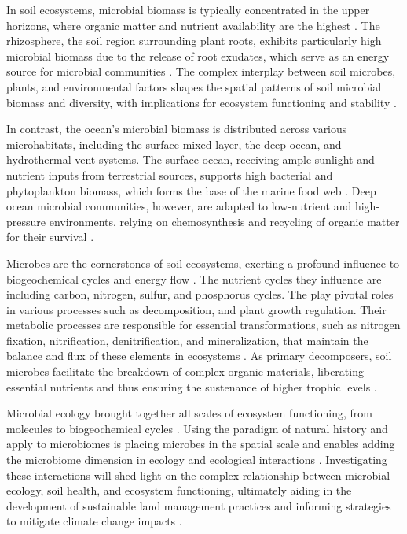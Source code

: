 In soil ecosystems, microbial biomass is typically concentrated in the upper
horizons, where organic matter and nutrient availability are the highest \parencite{Anthony2023}.
The rhizosphere, the soil region surrounding plant roots, exhibits particularly
high microbial biomass due to the release of root exudates, which serve as an
energy source for microbial communities \parencite{beugnon2022Abiotic}. The complex
interplay between soil microbes, plants, and environmental factors shapes the
spatial patterns of soil microbial biomass and diversity, with implications for
ecosystem functioning and stability \parencite{philippot2024the-interplay}.

In contrast, the ocean's microbial biomass is distributed across various
microhabitats, including the surface mixed layer, the deep ocean, and hydrothermal
vent systems. The surface ocean, receiving ample sunlight and nutrient inputs
from terrestrial sources, supports high bacterial and phytoplankton biomass,
which forms the base of the marine food web \parencite{Sunagawa2015}. Deep ocean
microbial communities, however, are adapted to low-nutrient and high-pressure
environments, relying on chemosynthesis and recycling of organic matter for their survival \parencite{christakis2018microbial}.

Microbes are the cornerstones of soil ecosystems, exerting a profound influence
to biogeochemical cycles and energy flow \parencite{graham2016Microbes}. The nutrient cycles they influence are
including carbon, nitrogen, sulfur, and phosphorus cycles.
The play pivotal roles in various processes such as decomposition,
and plant growth regulation.
Their metabolic processes are responsible for essential transformations, such as
nitrogen fixation, nitrification, denitrification, and mineralization, that
maintain the balance and flux of these elements in ecosystems \parencite{martiny2023Investigating}.
As primary decomposers, soil microbes facilitate the breakdown of complex
organic materials, liberating essential nutrients and thus ensuring the
sustenance of higher trophic levels \parencite{GRANDY201640}.

Microbial ecology brought together all scales of ecosystem functioning, from
molecules to biogeochemical cycles \parencite{hall2018understanding,kempes2012Growth,raes2011molecular}.
Using the paradigm of natural history and apply to microbiomes \parencite{Fierer2006} is placing microbes
in the spatial scale and enables adding the microbiome dimension in ecology and ecological interactions \parencite{Martiny2006}.
Investigating these
interactions will shed light on the complex relationship between microbial
ecology, soil health, and ecosystem functioning, ultimately aiding in the
development of sustainable land management practices and informing strategies to mitigate climate change impacts \parencite{cavicchioli2019scientists}.


